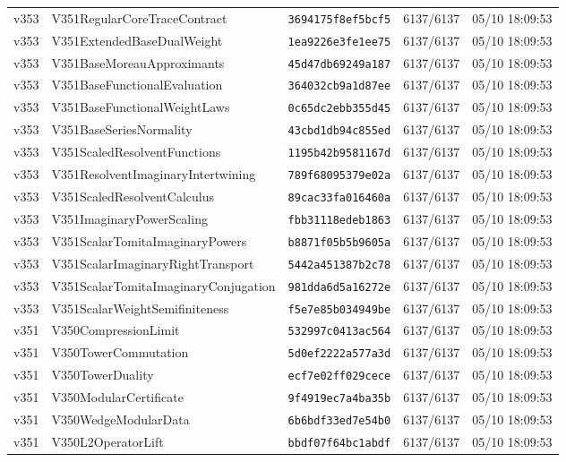 \documentclass[11pt]{article}
\theoremstyle{definition}\newtheorem{deriv}{Derivação}
\begin{document}
{\begin{longtable}{@{}lllll@{}}
v353 & V351RegularCoreTraceContract & \texttt{3694175f8ef5bcf5} & 6137/6137 & 05/10 18:09:53 \\
v353 & V351ExtendedBaseDualWeight & \texttt{1ea9226e3fe1ee75} & 6137/6137 & 05/10 18:09:53 \\
v353 & V351BaseMoreauApproximants & \texttt{45d47db69249a187} & 6137/6137 & 05/10 18:09:53 \\
v353 & V351BaseFunctionalEvaluation & \texttt{364032cb9a1d87ee} & 6137/6137 & 05/10 18:09:53 \\
v353 & V351BaseFunctionalWeightLaws & \texttt{0c65dc2ebb355d45} & 6137/6137 & 05/10 18:09:53 \\
v353 & V351BaseSeriesNormality & \texttt{43cbd1db94c855ed} & 6137/6137 & 05/10 18:09:53 \\
v353 & V351ScaledResolventFunctions & \texttt{1195b42b9581167d} & 6137/6137 & 05/10 18:09:53 \\
v353 & V351ResolventImaginaryIntertwining & \texttt{789f68095379e02a} & 6137/6137 & 05/10 18:09:53 \\
v353 & V351ScaledResolventCalculus & \texttt{89cac33fa016460a} & 6137/6137 & 05/10 18:09:53 \\
v353 & V351ImaginaryPowerScaling & \texttt{fbb31118edeb1863} & 6137/6137 & 05/10 18:09:53 \\
v353 & V351ScalarTomitaImaginaryPowers & \texttt{b8871f05b5b9605a} & 6137/6137 & 05/10 18:09:53 \\
v353 & V351ScalarImaginaryRightTransport & \texttt{5442a451387b2c78} & 6137/6137 & 05/10 18:09:53 \\
v353 & V351ScalarTomitaImaginaryConjugation & \texttt{981dda6d5a16272e} & 6137/6137 & 05/10 18:09:53 \\
v353 & V351ScalarWeightSemifiniteness & \texttt{f5e7e85b034949be} & 6137/6137 & 05/10 18:09:53 \\
v351 & V350CompressionLimit & \texttt{532997c0413ac564} & 6137/6137 & 05/10 18:09:53 \\
v351 & V350TowerCommutation & \texttt{5d0ef2222a577a3d} & 6137/6137 & 05/10 18:09:53 \\
v351 & V350TowerDuality & \texttt{ecf7e02ff029cece} & 6137/6137 & 05/10 18:09:53 \\
v351 & V350ModularCertificate & \texttt{9f4919ec7a4ba35b} & 6137/6137 & 05/10 18:09:53 \\
v351 & V350WedgeModularData & \texttt{6b6bdf33ed7e54b0} & 6137/6137 & 05/10 18:09:53 \\
v351 & V350L2OperatorLift & \texttt{bbdf07f64bc1abdf} & 6137/6137 & 05/10 18:09:53 \\

\end{longtable}}
\end{document}
